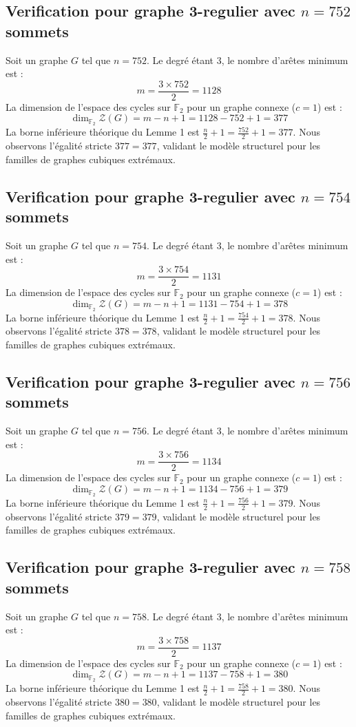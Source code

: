\documentclass[11pt,a4paper]{article}
\begin{document}
\subsection{Verification pour graphe 3-regulier avec $n=752$ sommets}
Soit un graphe $G$ tel que $n = 752$. Le degré étant 3, le nombre d'arêtes minimum est :
$$ m = \frac{3 \times 752}{2} = 1128 $$
La dimension de l'espace des cycles sur $\mathbb{F}_2$ pour un graphe connexe ($c=1$) est :
$$ \dim_{\mathbb{F}_2} \mathcal{Z}(G) = m - n + 1 = 1128 - 752 + 1 = 377 $$
La borne inférieure théorique du Lemme 1 est $\frac{n}{2} + 1 = \frac{752}{2} + 1 = 377$.
Nous observons l'égalité stricte $377 = 377$, validant le modèle structurel pour les familles de graphes cubiques extrémaux.

\subsection{Verification pour graphe 3-regulier avec $n=754$ sommets}
Soit un graphe $G$ tel que $n = 754$. Le degré étant 3, le nombre d'arêtes minimum est :
$$ m = \frac{3 \times 754}{2} = 1131 $$
La dimension de l'espace des cycles sur $\mathbb{F}_2$ pour un graphe connexe ($c=1$) est :
$$ \dim_{\mathbb{F}_2} \mathcal{Z}(G) = m - n + 1 = 1131 - 754 + 1 = 378 $$
La borne inférieure théorique du Lemme 1 est $\frac{n}{2} + 1 = \frac{754}{2} + 1 = 378$.
Nous observons l'égalité stricte $378 = 378$, validant le modèle structurel pour les familles de graphes cubiques extrémaux.

\subsection{Verification pour graphe 3-regulier avec $n=756$ sommets}
Soit un graphe $G$ tel que $n = 756$. Le degré étant 3, le nombre d'arêtes minimum est :
$$ m = \frac{3 \times 756}{2} = 1134 $$
La dimension de l'espace des cycles sur $\mathbb{F}_2$ pour un graphe connexe ($c=1$) est :
$$ \dim_{\mathbb{F}_2} \mathcal{Z}(G) = m - n + 1 = 1134 - 756 + 1 = 379 $$
La borne inférieure théorique du Lemme 1 est $\frac{n}{2} + 1 = \frac{756}{2} + 1 = 379$.
Nous observons l'égalité stricte $379 = 379$, validant le modèle structurel pour les familles de graphes cubiques extrémaux.

\subsection{Verification pour graphe 3-regulier avec $n=758$ sommets}
Soit un graphe $G$ tel que $n = 758$. Le degré étant 3, le nombre d'arêtes minimum est :
$$ m = \frac{3 \times 758}{2} = 1137 $$
La dimension de l'espace des cycles sur $\mathbb{F}_2$ pour un graphe connexe ($c=1$) est :
$$ \dim_{\mathbb{F}_2} \mathcal{Z}(G) = m - n + 1 = 1137 - 758 + 1 = 380 $$
La borne inférieure théorique du Lemme 1 est $\frac{n}{2} + 1 = \frac{758}{2} + 1 = 380$.
Nous observons l'égalité stricte $380 = 380$, validant le modèle structurel pour les familles de graphes cubiques extrémaux.
\end{document}
